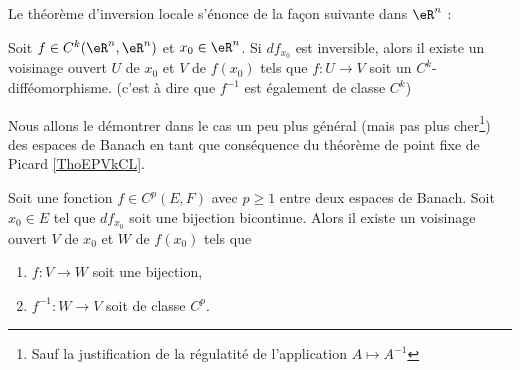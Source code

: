 Le théorème d'inversion locale s'énonce de la façon suivante dans \( \eR^n\) :
\begin{theorem} %
    Soit \( f\in C^k(\eR^n,\eR^n)\) et \( x_0\in \eR^n\). Si \( df_{x_0}\) est inversible, alors il existe un voisinage ouvert \( U\) de \( x_0\) et \( V\) de \( f(x_0)\) tels que \( f\colon U\to V\) soit un \( C^k\)-difféomorphisme. (c'est à dire que \( f^{-1}\) est également de classe \( C^k\))
\end{theorem}
Nous allons le démontrer dans le cas un peu plus général (mais pas plus cher\footnote{Sauf la justification de la régulatité de l'application \( A\mapsto A^{-1}\)}) des espaces de Banach en tant que conséquence du théorème de point fixe de Picard \ref{ThoEPVkCL}.
\begin{theorem} \label{ThoXWpzqCn}
    Soit une fonction \( f\in C^p(E,F)\) avec \( p\geq 1\) entre deux espaces de Banach. Soit \( x_0\in E\) tel que \( df_{x_0}\) soit une bijection bicontinue. Alors il existe un voisinage ouvert \( V\) de \( x_0\) et \( W\) de \( f(x_0)\) tels que
    \begin{enumerate}
        \item
        \( f\colon V\to W\) soit une bijection,
    \item
        \( f^{-1}\colon W\to V\) soit de classe \( C^p\).
    \end{enumerate}
\end{theorem}

